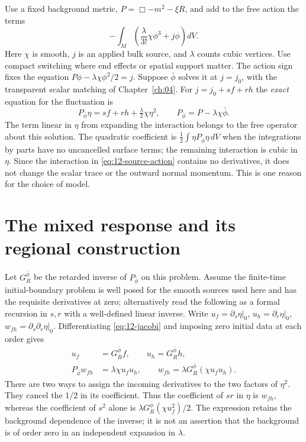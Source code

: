 Use a fixed background metric, $P=\Box-m^2-\xi R$, and add to the free
action the terms
\begin{equation}
 -\int_M\left(\frac{\lambda}{3!}\chi\phi^3+j\phi\right)dV .
 \label{eq:12-source-action}
\end{equation}
Here $\chi$ is smooth, $j$ is an applied bulk source, and $\lambda$ counts
cubic vertices. Use compact switching where end effects or spatial support
matter. The action sign fixes the equation
$P\phi-\lambda\chi\phi^2/2=j$. Suppose $\bar\phi$ solves it at $j=j_0$,
with the transparent scalar matching of Chapter~\ref{ch:04}. For
$j=j_0+s f+r h$ the \emph{exact} equation for the fluctuation is
\begin{equation}
 P_{\bar\phi}\eta=s f+r h+\tfrac{\lambda}{2}\chi\eta^2,
 \qquad P_{\bar\phi}=P-\lambda\chi\bar\phi .
 \label{eq:12-jacobi}
\end{equation}
The term linear in $\eta$ from expanding the interaction belongs to the
free operator about this solution. The quadratic coefficient is
$\tfrac12\int\eta P_{\bar\phi}\eta\,dV$ when the integrations by parts
have no uncancelled surface terms; the remaining interaction is cubic in
$\eta$. Since the interaction in \eqref{eq:12-source-action} contains no
derivatives, it does not change the scalar trace or the outward normal
momentum. This is one reason for the choice of model.

\section{The mixed response and its regional construction}
Let $G_R^{\bar\phi}$ be the retarded inverse of $P_{\bar\phi}$ on this
problem. Assume the finite-time initial-boundary problem is well posed for
the smooth sources used here and has the requisite derivatives at zero;
alternatively read the following as a formal recursion in $s,r$ with a
well-defined linear inverse. Write $u_f=\partial_s\eta|_0$,
$u_h=\partial_r\eta|_0$, $w_{fh}=\partial_s\partial_r\eta|_0$.
Differentiating \eqref{eq:12-jacobi} and imposing zero initial data at each
order gives
\begin{align}
 u_f&=G_R^{\bar\phi} f,\qquad u_h=G_R^{\bar\phi}h,\nonumber\\
 P_{\bar\phi}w_{fh}&=\lambda\chi u_f u_h,\qquad
 w_{fh}=\lambda G_R^{\bar\phi}\!\left(\chi u_f u_h\right).
 \label{eq:12-response}
\end{align}
There are two ways to assign the incoming derivatives to the two factors
of $\eta^2$. They cancel the $1/2$ in its coefficient. Thus the coefficient
of $sr$ in $\eta$ is $w_{fh}$, whereas the coefficient of $s^2$ alone is
$\lambda G_R^{\bar\phi}(\chi u_f^2)/2$. The expression retains the
background dependence of the inverse; it is not an assertion that the
background is of order zero in an independent expansion in $\lambda$.

